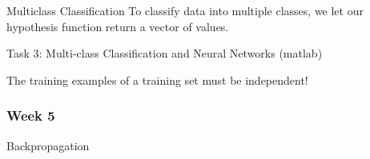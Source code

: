 \documentclass[12pt,a4paper]{report}
\begin{document}
	Multiclass Classification
	To classify data into multiple classes, we let our hypothesis function return a vector of values. 
	
	Task 3: Multi-class Classification and Neural Networks (matlab)
	
	The training examples of a training set must be independent!
	\subsubsection{Week 5}
	
	Backpropagation	
	
	
	
\end{document}
